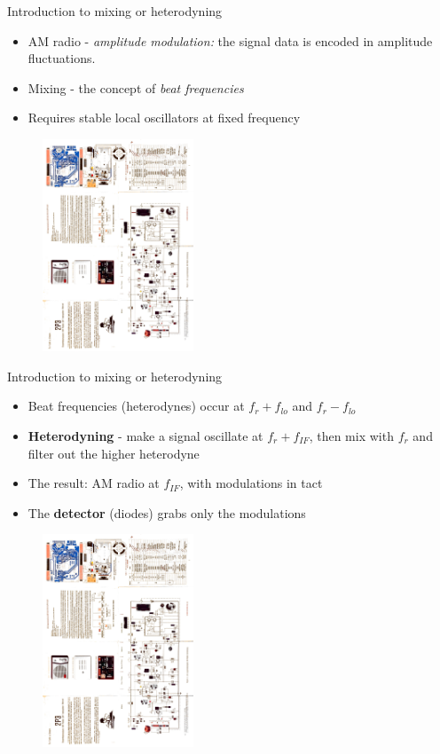 \documentclass{beamer}
\begin{document}
\begin{frame}{Introduction to mixing or heterodyning}
\small
\begin{itemize}
\item AM radio - \textit{amplitude modulation:} the signal data is encoded in amplitude fluctuations.
\item Mixing - the concept of \textit{beat frequencies}
\item Requires stable \alert{local oscillators} at fixed frequency
\end{itemize}
\begin{figure}
\centering
\includegraphics[width=0.4\textwidth,angle=270,trim=6.75cm 15cm 10.5cm 8cm,clip=true]{figures/2P3.pdf}
\end{figure}
\end{frame}

\begin{frame}{Introduction to mixing or heterodyning}
\small
\begin{itemize}
\item Beat frequencies (heterodynes) occur at $f_{r} + f_{lo}$ and $f_{r} - f_{lo}$
\item \textbf{Heterodyning} - make a signal oscillate at $f_{r} + f_{IF}$, then mix with $f_{r}$ and filter out the higher heterodyne
\item The result: AM radio at $f_{IF}$, with modulations in tact
\item The \textbf{detector} (diodes) grabs only the modulations
\end{itemize}
\begin{figure}
\centering
\includegraphics[width=0.4\textwidth,angle=270,trim=6.75cm 15cm 10.5cm 8cm,clip=true]{figures/2P3.pdf}
\end{figure}
\end{frame}
\end{document}
